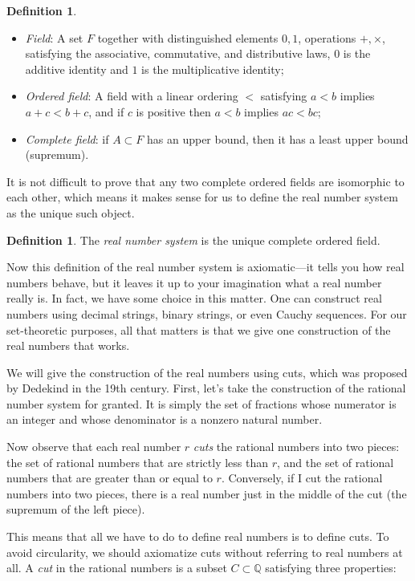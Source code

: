 \documentclass[11pt,oneside]{amsbook}
\newcommand{\Q}{\mathbb Q}
\theoremstyle{definition}
\theoremstyle{plain}
\theoremstyle{definition}
\newtheorem{definition}[theorem]{Definition}
\theoremstyle{remark}
\numberwithin{equation}{section}
\numberwithin{figure}{section}
\begin{document}
\begin{definition}
  \begin{itemize}
    \item \emph{Field}: A set $F$ together with distinguished elements $0,1$, operations $+,\times$, satisfying the associative, commutative, and distributive laws, $0$ is the additive identity and $1$ is the multiplicative identity;
    \item \emph{Ordered field}: A field with a linear ordering $<$ satisfying $a<b$ implies $a+c<b+c$, and if $c$ is positive then $a<b$ implies $ac<bc$;
    \item \emph{Complete field}: if $A\subset F$ has an upper bound, then it has a least upper bound (supremum).
  \end{itemize}
\end{definition}

It is not difficult to prove that any two complete ordered fields are isomorphic to each other, which means it makes sense for us to define the real number system as the unique such object.

\begin{definition}
  The \emph{real number system} is the unique complete ordered field.
\end{definition}

Now this definition of the real number system is axiomatic---it tells you how real numbers behave, but it leaves it up to your imagination what a real number really is. In fact, we have some choice in this matter. One can construct real numbers using decimal strings, binary strings, or even Cauchy sequences. For our set-theoretic purposes, all that matters is that we give one construction of the real numbers that works.

We will give the construction of the real numbers using cuts, which was proposed by Dedekind in the 19th century. First, let's take the construction of the rational number system for granted. It is simply the set of fractions whose numerator is an integer and whose denominator is a nonzero natural number.

Now observe that each real number $r$ \emph{cuts} the rational numbers into two pieces: the set of rational numbers that are strictly less than $r$, and the set of rational numbers that are greater than or equal to $r$. Conversely, if I cut the rational numbers into two pieces, there is a real number just in the middle of the cut (the supremum of the left piece).

This means that all we have to do to define real numbers is to define cuts. To avoid circularity, we should axiomatize cuts without referring to real numbers at all. A \emph{cut} in the rational numbers is a subset $C\subset\Q$ satisfying three properties:
\end{document}
